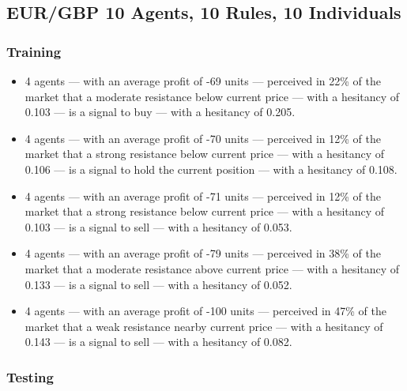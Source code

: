 \subsection{EUR/GBP 10 Agents, 10 Rules, 10 Individuals}
\label{results:interpretation-eur-gbp-10agents-10rules-10individuals}

\subsubsection{Training}

{\small
  \begin{itemize}
  \item 4 agents — with an average profit of -69 units — perceived in 22\% of the market that a moderate resistance below current price — with a hesitancy of 0.103 — is a signal to buy — with a hesitancy of 0.205.
  \item 4 agents — with an average profit of -70 units — perceived in 12\% of the market that a strong resistance below current price — with a hesitancy of 0.106 — is a signal to hold the current position — with a hesitancy of 0.108.
  \item 4 agents — with an average profit of -71 units — perceived in 12\% of the market that a strong resistance below current price — with a hesitancy of 0.103 — is a signal to sell — with a hesitancy of 0.053.
  \item 4 agents — with an average profit of -79 units — perceived in 38\% of the market that a moderate resistance above current price — with a hesitancy of 0.133 — is a signal to sell — with a hesitancy of 0.052.
  \item 4 agents — with an average profit of -100 units — perceived in 47\% of the market that a weak resistance nearby current price — with a hesitancy of 0.143 — is a signal to sell — with a hesitancy of 0.082.
  \end{itemize}
}

\subsubsection{Testing}

